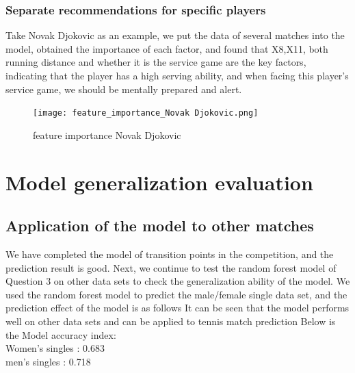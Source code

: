 \documentclass{mcmthesis}  %
\begin{document}
\subsubsection{Separate recommendations for specific players}
Take  Novak Djokovic as an example, we put the data of several matches into the model, obtained the importance of each factor, and found that X8,X11, both running distance and whether it is the service game are the key factors, indicating that the player has a high serving ability, and when facing this player's service game, we should be mentally prepared and alert.
\begin{figure}[!htb]  %
\small
\centering  %
\texttt{[image: feature\_importance\_Novak Djokovic.png]}  %
\caption{feature importance Novak Djokovic} \label{fig:feature_importance_Novak Djokovic.png}  %
\end{figure}  %



\section{Model generalization evaluation}

\subsection{Application of the model to other matches}

\hspace{1.5em}We have completed the model of transition points in the competition, and the prediction result is good. Next, we continue to test the random forest model of Question 3 on other data sets to check the generalization ability of the model.
\hspace{1.5em}We used the random forest model to predict the male/female single data set, and the prediction effect of the model is as follows
\hspace{1.5em}It can be seen that the model performs well on other data sets and can be applied to tennis match prediction
\hspace{1.5em}
Below is the Model accuracy index:\\
Women's singles : 0.683\\
men's singles : 0.718
\end{document}
